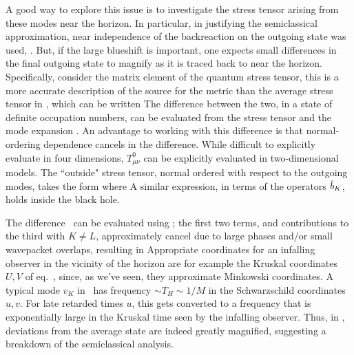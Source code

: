 A good way to explore this issue is to investigate the stress tensor arising from these modes near the horizon.  In particular, in justifying the semiclassical approximation, near independence of the backreaction on the outgoing state was used, \approxgrav.  But, if the large blueshift is important, one expects small differences in the final outgoing state to magnify as it is traced back to near the horizon.  Specifically, consider the matrix element of the quantum stress tensor,
%
\eqn{}
%
this is a more accurate description of the source for the metric than the average stress tensor in \classmet, which can be written  
%
\eqn{}
%
The difference between the two, in a state of definite occupation numbers,
%
\eqn{}
% 
can be evaluated from the stress tensor
%
\eqn{}
%
and the mode expansion \modedecomp.  An advantage to working with this difference is that normal-ordering dependence cancels in the difference.  While difficult to explicitly evaluate in four dimensions, $T^0_{\mu\nu}$ can be explicitly evaluated in two-dimensional models.
The ``outside" stress tensor, normal ordered with respect to the outgoing modes, takes the form
%
\eqn{}
%
where
%
\eqn{}
%
A similar expression, in terms of the operators ${\hat b}_K$, holds inside the black hole.

The difference \tdiffer\ can be evaluated using \fdstexp; the first two terms, and contributions to the third with $K\neq L$, approximately cancel due to large phases and/or small wavepacket overlaps, resulting in
%
\eqn{}
%
Appropriate coordinates for an infalling observer in the vicinity of the horizon are for example the Kruskal coordinates $U,V$ of eq.~\kruskdef, since, as we've seen,  they approximate Minkowski coordinates.  A typical mode $v_K$ in \fdT\ has frequency $\sim T_H\sim 1/M$ in the Schwarzschild coordinates $u,v$.  For late retarded times $u$, this gets converted to a frequency that is exponentially large in the Kruskal time seen by the infalling observer. Thus, in \fdT, deviations from the average state are indeed greatly magnified, suggesting a breakdown of the semiclassical analysis.

